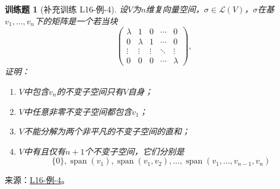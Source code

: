 \documentclass[UTF8,12pt,a4paper,fontset=fandol]{ctexart}
\newtheorem{exercise}{训练题}[section]
\begin{document}
\begin{exercise}[补充训练 L16-例-4]\label{prob:L16-例-4}
设$V$为$n$维复向量空间，$\sigma\in \mathcal{L}(V)$，$\sigma$在基$v_1,\ldots,v_n$下的矩阵是一个若当块
    \[\begin{pmatrix}
            \lambda & 1       & 0      & \cdots & 0       \\
            0       & \lambda & 1      & \cdots & 0       \\
            \vdots  & \vdots  & \vdots & \ddots & \vdots  \\
            0       & 0       & 0      & \cdots & \lambda
        \end{pmatrix},\]
    证明：
    \begin{enumerate}
        \item $V$中包含$v_n$的不变子空间只有$V$自身；

        \item $V$中任意非零不变子空间都包含$v_1$；

        \item $V$不能分解为两个非平凡的不变子空间的直和；

        \item $V$中有且仅有$n+1$个不变子空间，它们分别是
              \[\{0\},\operatorname{span}(v_1),\operatorname{span}(v_1,v_2),\ldots,\operatorname{span}(v_1,\ldots,v_{n-1},v_n)\]
    \end{enumerate}
\end{exercise}
\noindent 来源：\href{https://github.com/yhwu-is/Linear-Algebra-Left-Undone/blob/new/%E8%AE%B2%E4%B9%89/%E4%B8%93%E9%A2%98/16%20%E8%8B%A5%E5%BD%93%E6%A0%87%E5%87%86%E5%BD%A2.tex}{L16-例-4}。
\end{document}

